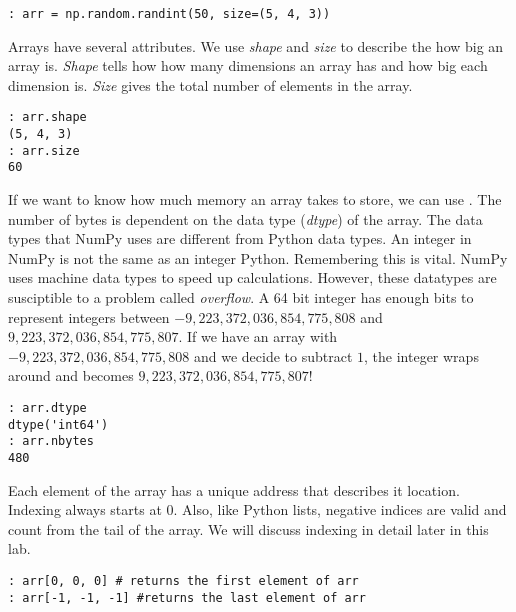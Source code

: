 \begin{lstlisting}
: arr = np.random.randint(50, size=(5, 4, 3))
\end{lstlisting}

Arrays have several attributes.  We use \emph{shape} and \emph{size} to describe the how big an array is.  \emph{Shape} tells how how many dimensions an array has and how big each dimension is.  \emph{Size} gives the total number of elements in the array.

\begin{lstlisting}
: arr.shape
(5, 4, 3)
: arr.size
60
\end{lstlisting}

If we want to know how much memory an array takes to store, we can use .  The number of bytes is dependent on the data type (\emph{dtype}) of the array.  The data types that NumPy uses are different from Python data types.  An integer in NumPy is not the same as an integer Python.  Remembering this is vital.  NumPy uses machine data types to speed up calculations.  However, these datatypes are susciptible to a problem called \emph{overflow}.  A 64 bit integer has enough bits to represent integers between $-9,223,372,036,854,775,808$ and $9,223,372,036,854,775,807$.  If we have an array with $-9,223,372,036,854,775,808$ and we decide to subtract $1$, the integer wraps around and becomes $9,223,372,036,854,775,807$!  

\begin{lstlisting}
: arr.dtype
dtype('int64')
: arr.nbytes
480
\end{lstlisting}

Each element of the array has a unique address that describes it location.  Indexing always starts at $0$.  Also, like Python lists, negative indices are valid and count from the tail of the array.  We will discuss indexing in detail later in this lab.

\begin{lstlisting}
: arr[0, 0, 0] # returns the first element of arr
: arr[-1, -1, -1] #returns the last element of arr
\end{lstlisting}

